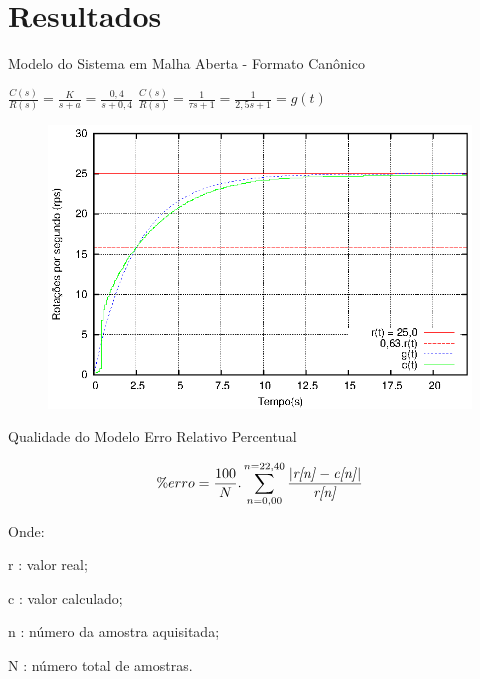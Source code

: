\section{Resultados}

\begin{frame}{Modelo do Sistema em Malha Aberta - Formato Canônico}

$  \frac{C(s)}{R(s)}=\frac{K}{s+a}=\frac{0,4}{s+0,4} $
\hspace{1cm}
$\frac{C(s)}{R(s)} = \frac{1}{\tau s+1} = \frac{1}{2,5 s+1} = g(t)$

\vspace{-0.5cm}
\begin{figure}[!htb]
\center\includegraphics[scale=0.9]{./plot/acaoMalhaAbertaTau.eps}
\label{fig:acaoMalhaAberTau}

\end{figure}


\end{frame}




\begin{frame}{Qualidade do Modelo}
Erro Relativo Percentual

\begin{equation}
 \% erro = \frac{100}{N} . \sum_{n = 0,00}^{n=22,40} {\frac{| \text{\emph{r[n]}} -\text{\emph{c[n]}} |}{\text{\emph{r[n]}}} } 
\end{equation}

Onde:

\setlength{\parindent}{2cm}
r : valor real; 

c : valor calculado;

n : número da amostra aquisitada;

N : número total de amostras.


\end{frame}



